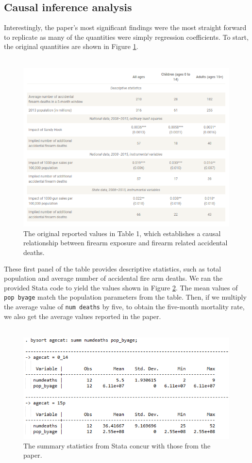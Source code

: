 \documentclass[12pt]{article}%
\begin{document}
\subsection*{Causal inference analysis}
Interestingly, the paper's most significant findings were the most straight forward to replicate as many of the quantities were simply regression coefficients. To start, the original quantities are shown in Figure \ref{fig:table_original}. \\ \\
\begin{figure}[hbt]
	\centering
	\includegraphics[width=.9\linewidth]{figures/table_original.png}
	\caption{The original reported values in Table 1, which establishes a causal relationship between firearm exposure and firearm related accidental deaths.}
	\label{fig:table_original}
\end{figure}
These first panel of the table provides descriptive statistics, such as total population and average number of accidental fire arm deaths. We ran the provided Stata code to yield the values shown in Figure \ref{fig:panel1}. The mean values of \texttt{pop byage} match the population parameters from the table. Then, if we multiply the average value of \texttt{num deaths} by five, to obtain the five-month mortality rate, we also get the average values reported in the paper. \\ \\
\begin{figure}[hbt]
	\centering
	\includegraphics[width=.9\linewidth]{figures/panel1.png}
	\caption{The summary statistics from Stata concur with those from the paper.}
	\label{fig:panel1}
\end{figure}
\end{document}
